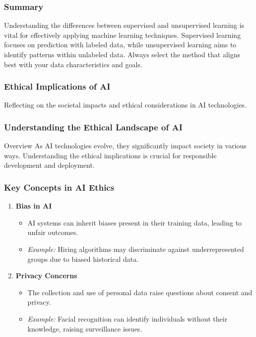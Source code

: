 \documentclass[aspectratio=169]{beamer}
\begin{document}
\begin{frame}[fragile]
    \frametitle{Summary}

    Understanding the differences between supervised and unsupervised learning is vital for effectively applying machine learning techniques. Supervised learning focuses on prediction with labeled data, while unsupervised learning aims to identify patterns within unlabeled data. Always select the method that aligns best with your data characteristics and goals.
\end{frame}

\begin{frame}[fragile]
    \frametitle{Ethical Implications of AI}
    Reflecting on the societal impacts and ethical considerations in AI technologies.
\end{frame}

\begin{frame}[fragile]
    \frametitle{Understanding the Ethical Landscape of AI}
    \begin{block}{Overview}
        As AI technologies evolve, they significantly impact society in various ways. Understanding the ethical implications is crucial for responsible development and deployment.
    \end{block}
\end{frame}

\begin{frame}[fragile]
    \frametitle{Key Concepts in AI Ethics}
    \begin{enumerate}
        \item \textbf{Bias in AI}
        \begin{itemize}
            \item AI systems can inherit biases present in their training data, leading to unfair outcomes.
            \item \textit{Example:} Hiring algorithms may discriminate against underrepresented groups due to biased historical data.
        \end{itemize}
        
        \item \textbf{Privacy Concerns}
        \begin{itemize}
            \item The collection and use of personal data raise questions about consent and privacy.
            \item \textit{Example:} Facial recognition can identify individuals without their knowledge, raising surveillance issues.
        \end{itemize}
    \end{enumerate}
\end{frame}
\end{document}
